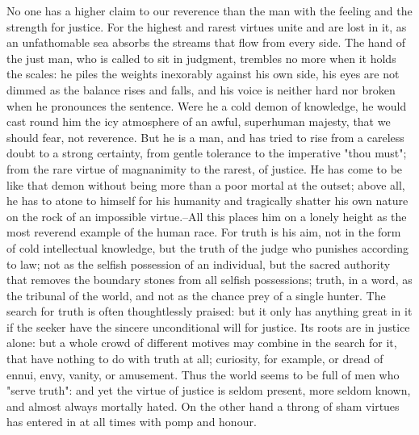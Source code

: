 No one has a higher claim to our reverence than the man with the
feeling and the strength for justice. For the highest and rarest
virtues unite and are lost in it, as an unfathomable sea absorbs the
streams that flow from every side. The hand of the just man, who is
called to sit in judgment, trembles no more when it holds the scales:
he piles the weights inexorably against his own side, his eyes are
not dimmed as the balance rises and falls, and his voice is neither
hard nor broken when he pronounces the sentence. Were he a cold demon
of knowledge, he would cast round him the icy atmosphere of an awful,
superhuman majesty, that we should fear, not reverence. But he is a
man, and has tried to rise from a careless doubt to a strong
certainty, from gentle tolerance to the imperative "thou must"; from
the rare virtue of magnanimity to the rarest, of justice. He has come
to be like that demon without being more than a poor mortal at the
outset; above all, he has to atone to himself for his humanity and
tragically shatter his own nature on the rock of an impossible
virtue.--All this places him on a lonely height as the most reverend
example of the human race. For truth is his aim, not in the form of
cold intellectual knowledge, but the truth of the judge who punishes
according to law; not as the selfish possession of an individual, but
the sacred authority that removes the boundary stones from all
selfish possessions; truth, in a word, as the tribunal of the world,
and not as the chance prey of a single hunter. The search for truth
is often thoughtlessly praised: but it only has anything great in it
if the seeker have the sincere unconditional will for justice. Its
roots are in justice alone: but a whole crowd of different motives
may combine in the search for it, that have nothing to do with truth
at all; curiosity, for example, or dread of ennui, envy, vanity, or
amusement. Thus the world seems to be full of men who "serve truth":
and yet the virtue of justice is seldom present, more seldom known,
and almost always mortally hated. On the other hand a throng of sham
virtues has entered in at all times with pomp and honour.

